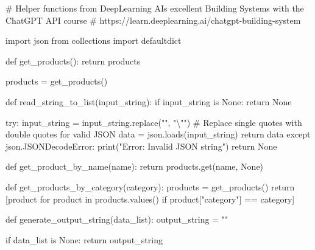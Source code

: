 \documentclass[
  letterpaper,
  DIV=11,
  numbers=noendperiod]{scrreprt}
\newenvironment{Shaded}{\begin{snugshade}}{\end{snugshade}}
\newcommand{\BuiltInTok}[1]{\textcolor[rgb]{0.00,0.23,0.31}{#1}}
\newcommand{\CharTok}[1]{\textcolor[rgb]{0.13,0.47,0.30}{#1}}
\newcommand{\CommentTok}[1]{\textcolor[rgb]{0.37,0.37,0.37}{#1}}
\newcommand{\ControlFlowTok}[1]{\textcolor[rgb]{0.00,0.23,0.31}{#1}}
\newcommand{\ImportTok}[1]{\textcolor[rgb]{0.00,0.46,0.62}{#1}}
\newcommand{\KeywordTok}[1]{\textcolor[rgb]{0.00,0.23,0.31}{#1}}
\newcommand{\NormalTok}[1]{\textcolor[rgb]{0.00,0.23,0.31}{#1}}
\newcommand{\OperatorTok}[1]{\textcolor[rgb]{0.37,0.37,0.37}{#1}}
\newcommand{\StringTok}[1]{\textcolor[rgb]{0.13,0.47,0.30}{#1}}
\newcommand{\VariableTok}[1]{\textcolor[rgb]{0.07,0.07,0.07}{#1}}
\begin{document}
\begin{Shaded}
\begin{Highlighting}[]
\CommentTok{\# Helper functions from DeepLearning AI\textquotesingle{}s excellent \textquotesingle{}Building Systems with the ChatGPT API\textquotesingle{} course}
\CommentTok{\# https://learn.deeplearning.ai/chatgpt{-}building{-}system}

\ImportTok{import}\NormalTok{ json}
\ImportTok{from}\NormalTok{ collections }\ImportTok{import}\NormalTok{ defaultdict}

\KeywordTok{def}\NormalTok{ get\_products():}
    \ControlFlowTok{return}\NormalTok{ products}

\NormalTok{products }\OperatorTok{=}\NormalTok{ get\_products()}

\KeywordTok{def}\NormalTok{ read\_string\_to\_list(input\_string):}
    \ControlFlowTok{if}\NormalTok{ input\_string }\KeywordTok{is} \VariableTok{None}\NormalTok{:}
        \ControlFlowTok{return} \VariableTok{None}

    \ControlFlowTok{try}\NormalTok{:}
\NormalTok{        input\_string }\OperatorTok{=}\NormalTok{ input\_string.replace(}\StringTok{"\textquotesingle{}"}\NormalTok{, }\StringTok{"}\CharTok{\textbackslash{}"}\StringTok{"}\NormalTok{)  }\CommentTok{\# Replace single quotes with double quotes for valid JSON}
\NormalTok{        data }\OperatorTok{=}\NormalTok{ json.loads(input\_string)}
        \ControlFlowTok{return}\NormalTok{ data}
    \ControlFlowTok{except}\NormalTok{ json.JSONDecodeError:}
        \BuiltInTok{print}\NormalTok{(}\StringTok{"Error: Invalid JSON string"}\NormalTok{)}
        \ControlFlowTok{return} \VariableTok{None}

\KeywordTok{def}\NormalTok{ get\_product\_by\_name(name):}
    \ControlFlowTok{return}\NormalTok{ products.get(name, }\VariableTok{None}\NormalTok{)}

\KeywordTok{def}\NormalTok{ get\_products\_by\_category(category):}
\NormalTok{    products }\OperatorTok{=}\NormalTok{ get\_products()}
    \ControlFlowTok{return}\NormalTok{ [product }\ControlFlowTok{for}\NormalTok{ product }\KeywordTok{in}\NormalTok{ products.values() }\ControlFlowTok{if}\NormalTok{ product[}\StringTok{"category"}\NormalTok{] }\OperatorTok{==}\NormalTok{ category]}

\KeywordTok{def}\NormalTok{ generate\_output\_string(data\_list):}
\NormalTok{    output\_string }\OperatorTok{=} \StringTok{""}

    \ControlFlowTok{if}\NormalTok{ data\_list }\KeywordTok{is} \VariableTok{None}\NormalTok{:}
        \ControlFlowTok{return}\NormalTok{ output\_string}


\end{Highlighting}
\end{Shaded}
\end{document}
